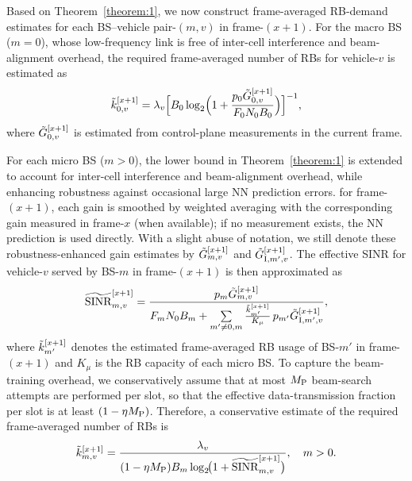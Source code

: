 \documentclass[conference, a4paper]{IEEEtran}
\newcommand{\rev}[1]{\textcolor{revisioncolor}{{}#1}}
\newif\ifshowdeletions
\newcommand{\currentdel}[1]{\ifshowdeletions\textcolor{deletioncolor}{\sout{#1}}\fi}
\theoremstyle{remark}
\begin{document}
Based on Theorem~\ref{theorem:1}, we now construct frame-averaged RB-demand estimates for each BS–vehicle pair-$(m,v)$ in frame-$(x\!+\!1)$.
For the macro BS ($m=0$), whose low-frequency link is free of inter-cell interference and beam-alignment overhead, the required frame-averaged number of RBs for vehicle-$v$ is estimated as 
\begin{equation}
\label{eq:RB_demand_hat_macro}
    \Tilde{k}_{0,v}^{[x+1]}
    = \lambda_v
      \Bigl[
        B_0 \log_2 \Bigl(
        1 + \frac{ p_0 \Tilde{G}_{0,v}^{[x+1]}}{F_0 N_0 B_0}
        \Bigr)
      \Bigr]^{-1},
\end{equation}
where $\Tilde{G}_{0,v}^{[x+1]}$ is estimated from control-plane measurements in the current frame.

For each micro BS ($m>0$), the lower bound in Theorem~\ref{theorem:1} is extended to account for inter-cell interference and beam-alignment overhead, while enhancing robustness against occasional large NN prediction errors. \currentdel{Given the NN-predicted frame-averaged gains} for frame-$(x\!+\!1)$, each gain is smoothed by weighted averaging with the corresponding gain measured in frame-$x$ (when available); if no measurement exists, the NN prediction is used directly. With a slight abuse of notation, we still denote these robustness-enhanced gain estimates by $\Tilde{G}_{m,v}^{[x+1]}$ and $\Tilde{G}_{{\rm I},m',v}^{[x+1]}$. The effective SINR for vehicle-$v$ served by BS-$m$ in frame-$(x\!+\!1)$ is then approximated as
\begin{equation}
\label{eq:eff_SINR_hat}
    \widetilde{\mathrm{SINR}}_{m,v}^{[x+1]}
    = \frac{p_m \Tilde{G}_{m,v}^{[x+1]}}
           {F_m N_0 B_m
            + \sum\limits_{m'\neq 0,m}
              \frac{\Tilde{k}_{m'}^{[x+1]}}{K_\mu}\, p_{m'} \Tilde{G}_{{\rm I},m',v}^{[x+1]}},
\end{equation}
where $\Tilde{k}_{m'}^{[x+1]}$ denotes the estimated frame-averaged RB usage of BS-$m'$ in frame-$(x\!+\!1)$ and $K_\mu$ is the RB capacity of each micro BS. To capture the beam-training overhead, we conservatively assume that at most $M_{\rm P}$ beam-search attempts are performed per slot, so that the effective data-transmission fraction per slot is\rev{ at least} $(1-\eta M_{\rm P})$. Therefore, a conservative estimate of the required frame-averaged number of RBs is
\begin{equation}
\label{eq:RB_demand_hat}
    \Tilde{k}_{m,v}^{[x+1]}
    = \frac{\lambda_v}{(1-\eta M_{\rm P}) B_m \log_2\!\bigl(1+\widetilde{\mathrm{SINR}}_{m,v}^{[x+1]}\bigr)},
    \quad m>0.
\end{equation}
\end{document}
